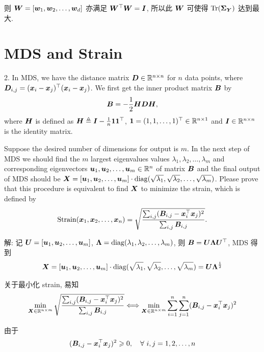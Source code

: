 \documentclass{article}
\begin{document}
则 $\bm{W}=[\bm{w}_1,\bm{w}_2,\dots,\bm{w}_d]$ 亦满足 $\bm{W}^\top\bm{W}=\bm{I}$, 所以此 $\bm{W}$ 可使得 $\operatorname{Tr}(\bm{\Sigma}_{\bm{Y}})$ 达到最大.

\section*{MDS and Strain}

2. In MDS, we have the distance matrix $\bm{D}\in\mathbb{R}^{n\times n}$ for $n$ data points, where $\bm{D}_{i,j}=(\bm{x}_i-\bm{x}_j)^\top(\bm{x}_i-\bm{x}_j)$. We first get the inner product matrix $\bm{B}$ by
\begin{equation}
  \bm{B}=-\frac{1}{2}\bm{H}\bm{D}\bm{H},
\end{equation}
where $\bm{H}$ is defined as $\bm{H}\triangleq\bm{I}-\frac{1}{n}\bm{1}\bm{1}^\top$, $\bm{1}=(1,1,\dots,1)^\top\in\mathbb{R}^{n\times 1}$ and $\bm{I}\in\mathbb{R}^{n\times n}$ is the identity matrix.

Suppose the desired number of dimensions for output is $m$. In the next step of MDS we should find the $m$ largest eigenvalues values $\lambda_1, \lambda_2, \dots, \lambda_m$ and corresponding eigenvectors $\bm{u}_1, \bm{u}_2, \dots, \bm{u}_m\in\mathbb{R}^n$ of matrix $\bm{B}$ and the final output of MDS should be $\bm{X}=[\bm{u}_1, \bm{u}_2, \dots, \bm{u}_m]\cdot\operatorname{diag}(\sqrt{\lambda_1}, \sqrt{\lambda_2}, \dots, \sqrt{\lambda_m})$. Please prove that this procedure is equivalent to find $\bm{X}$ to minimize the strain, which is defined by
\begin{equation}
  \mathrm{Strain}(\bm{x}_1,\bm{x}_2,\dots,\bm{x}_n)=\sqrt{\frac{\sum_{i,j}(\bm{B}_{i,j} - \bm{x}_i^\top\bm{x}_j)^2}{\sum_{i,j}\bm{B}_{i,j}}}.
\end{equation}

解: 记 $\bm{U}=[\bm{u}_1, \bm{u}_2, \dots, \bm{u}_m]$, $\bm{\Lambda}=\operatorname{diag}(\lambda_1, \lambda_2, \dots, \lambda_m)$, 则 $\bm{B}=\bm{U}\bm{\Lambda}\bm{U}^\top$,  MDS 得到
\begin{equation}
  \bm{X}
  =[\bm{u}_1, \bm{u}_2, \dots, \bm{u}_m]\cdot\operatorname{diag}(\sqrt{\lambda_1}, \sqrt{\lambda_2}, \dots, \sqrt{\lambda_m})
  =\bm{U}\bm{\Lambda}^{\frac{1}{2}}
\end{equation}

关于最小化 strain, 易知
\begin{equation}
  \min_{\bm{X}\in\mathbb{R}^{n\times m}}\sqrt{\frac{\sum_{i,j}(\bm{B}_{i,j} - \bm{x}_i^\top\bm{x}_j)^2}{\sum_{i,j}\bm{B}_{i,j}}}
  \Longleftrightarrow
  \min_{\bm{X}\in\mathbb{R}^{n\times m}}\sum_{i=1}^n\sum_{j=1}^n(\bm{B}_{i,j} - \bm{x}_i^\top\bm{x}_j)^2
\end{equation}

由于
\begin{equation}
  (\bm{B}_{i,j} - \bm{x}_i^\top\bm{x}_j)^2\geqslant0,\quad\forall~i,j=1,2,\dots,n
\end{equation}
\end{document}
